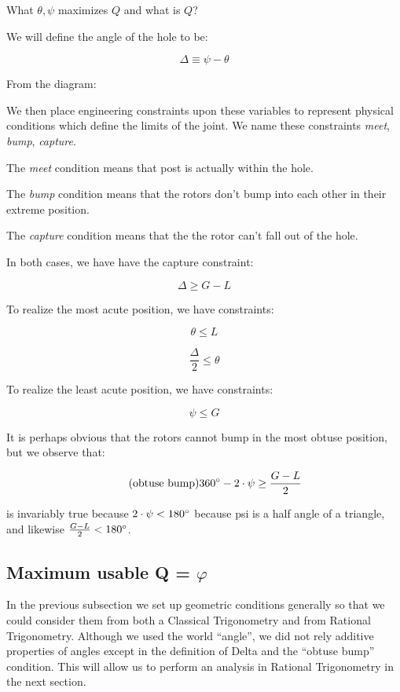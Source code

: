 \documentclass[11pt]{article}
\begin{document}
\bigskip

What $\theta, \psi$ maximizes $Q$ and what is $Q$?

\bigskip

We will define the angle of the hole to be:

\[\tag{Delta Definition} \Delta \equiv \psi - \theta \]

From the diagram:


We then place engineering constraints upon these variables to represent physical conditions
which define the limits of the joint.
We name these constraints \textit{meet}, \textit{bump}, \textit{capture}.

The \textit{meet} condition means that post is actually within the hole.

The \textit{bump} condition means that the rotors don't bump into each other
in their extreme position.

The \textit{capture} condition means that the the rotor can't fall out of the hole.

In both cases, we have have the capture constraint:

\[ \tag{capture} \Delta \geq G - L \]

To realize the most acute position, we have constraints:

\[ \tag{acute meet} \theta \leq L \]

\[ \tag{acute bump} \frac{\Delta}{2} \leq \theta  \]

To realize the least acute position, we have constraints:

\[ \tag{obtuse meet}  \psi \leq G \]

It is perhaps obvious that the rotors cannot bump in the most obtuse position, but we observe that:

\[ \tag{obtuse bump} 360\degree - 2\cdot \psi \geq \frac{G - L}{2} \]

is invariably true because $2\cdot\psi < 180\degree$ because psi is a half angle of a triangle, and likewise $\frac{G - L}{2} < 180\degree$.

\subsection{Maximum usable Q = $\varphi$}

In the previous subsection we set up geometric conditions generally so that we could consider them from
both a Classical Trigonometry and from Rational Trigonometry.  Although we used the world ``angle'', we did not
rely additive properties of angles except in the definition of Delta and the ``obtuse bump'' condition.  This will allow us
to perform an analysis in Rational Trigonometry in the next section.
\end{document}
